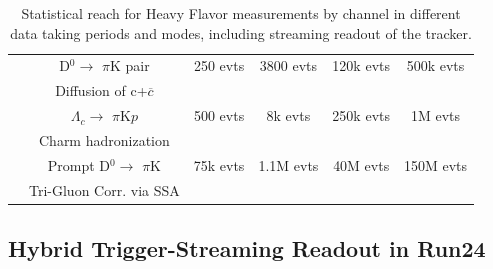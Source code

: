 \begin{table}
\begin{tabular}{|c|c|c|c|c|c|}
        & 
        D$^{0} \rightarrow$ $\pi$K pair
        & 250 evts  
        & 3800 evts
        & 120k evts 
        & 500k evts \\ 
         &  Diffusion of c+$\overline{c}$
        &   
        &  
        & 
        &  \\ \hline 
 
         & 
        $\Lambda_{c} \rightarrow$ $\pi$K$p$ 
        & 500 evts  
        & 8k evts
        & 250k evts 
        & 1M evts \\ 
         &  Charm hadronization
        &   
        &  
        & 
        &  \\ \hline 
        
        &
        Prompt D$^{0} \rightarrow$ $\pi$K  
        & 75k evts  
        & 1.1M evts
        & 40M evts 
        & 150M evts \\ 
         & Tri-Gluon Corr. via SSA 
        &   
        &  
        & 
        &  \\ \hline 
        
    \end{tabular}
    \caption{Statistical reach for Heavy Flavor \pp measurements by channel in different data taking periods and modes, including streaming readout of the tracker.}
    \label{tab:HFppreach}
\end{table}
 




 
 
\subsection{Hybrid Trigger-Streaming Readout in Run24}
 


